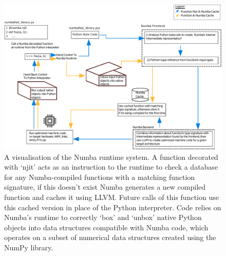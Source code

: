 \begin{figure}[h]
    \centering
    \includegraphics[width=\linewidth]{images/ch_1/numba.pdf}
    \caption{A visualisation of the Numba runtime system. A function decorated with `njit' acts as an instruction to the runtime to check a database for any Numba-compiled functions with a matching function signature, if this doesn't exist Numba generates a new compiled function and caches it using LLVM. Future calls of this function use this cached version in place of the Python interpreter. Code relies on Numba's runtime to correctly `box' and `unbox' native Python objects into data structures compatible with Numba code, which operates on a subset of numerical data structures created using the NumPy library.}
    \label{fig:chpt:1:sec:1:numba_runtime}
\end{figure}


